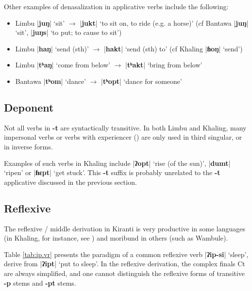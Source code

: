 \documentclass[oldfontcommands,oneside,a4paper,11pt]{article}
\newcommand{\ipa}[1]{\textbf{{\phon\mbox{#1}}}} %
\newcommand{\dhatu}[2]{|\ipa{#1}| `#2'}
\begin{document}
Other examples of denasalization in applicative verbs include the following:

\begin{itemize}
\item Limbu \dhatu{juŋ}{sit} $\rightarrow $ \dhatu{jukt}{to sit on, to ride (e.g. a horse)} (cf Bantawa \dhatu{juŋ}{sit}, \dhatu{juŋs}{to put; to cause to sit})
\item Limbu \dhatu{haŋ}{send (sth)} $\rightarrow $ \dhatu{hakt}{send (sth) to} (cf Khaling \dhatu{ɦoŋ}{send})
\item Limbu \dhatu{tʰaŋ}{come from below} $\rightarrow $ \dhatu{tʰakt}{bring from below}
\item Bantawa \dhatu{tʰom}{dance} $\rightarrow $ \dhatu{tʰopt}{dance for someone}
\end{itemize}
 
\subsection{Deponent} \label{sec:deponent}
Not all verbs in \ipa{-t} are syntactically transitive. In both Limbu and Khaling, many impersonal verbs or verbs with experiencer (\citealt{michailovsky97deponent}) are only used in third singular, or in inverse forms.  

Examples of such verbs in Khaling include \dhatu{ʔopt}{rise (of the sun)},  \dhatu{dumt}{ripen} or \dhatu{ɦɛpt}{get stuck}. This \ipa{-t} suffix is probably unrelated to the \ipa{-t} applicative discussed in the previous section. 

\subsection{Reflexive} \label{sec:refl}
The reflexive / middle derivation in Kiranti is very productive in some languages (in Khaling, for instance, see \citealt{jacques16si}) and moribund in others (such as Wambule). 


Table \ref{tab:ip.vr} presents the paradigm of a common reflexive verb \dhatu{ʔip-si}{sleep}, derive from \dhatu{ʔipt}{put to sleep}. In the reflexive derivation, the complex finals Ct are always simplified, and one cannot distinguish the reflexive forms of transitive \ipa{-p} stems and \ipa{-pt} stems.
\end{document}
